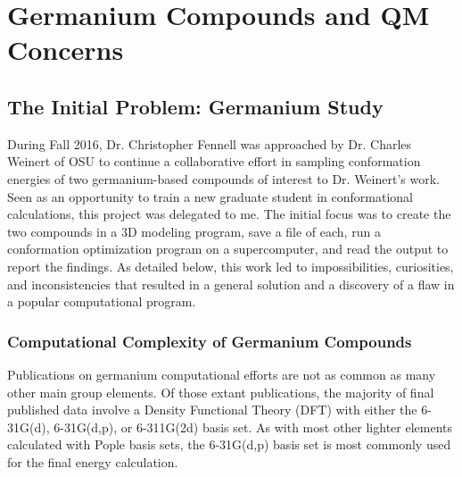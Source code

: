 \chapter{Germanium Compounds and QM Concerns}
\label{ch:Germanium}

%

\section{The Initial Problem: Germanium Study}

During Fall 2016, Dr. Christopher Fennell was approached by Dr. Charles Weinert of OSU to continue a collaborative effort in sampling conformation energies of two germanium-based compounds of interest to Dr. Weinert's work. 
Seen as an opportunity to train a new graduate student in conformational calculations, this project was delegated to me.
The initial focus was to create the two compounds in a 3D modeling program, save a file of each, run a conformation optimization program on a supercomputer, and read the output to report the findings.
As detailed below, this work led to impossibilities, curiosities, and inconsistencies that resulted in a general solution and a discovery of a flaw in a popular computational program.

\subsection{Computational Complexity of Germanium Compounds}

Publications on germanium computational efforts are not as common as many other main group elements. 
Of those extant publications, the majority of final published data involve a Density Functional Theory (DFT) with either the 6-31G(d), 6-31G(d,p), or 6-311G(2d) basis set.\cite{GeCompStudy1}
As with most other lighter elements calculated with Pople basis sets, the 6-31G(d,p) basis set is most commonly used for the final energy calculation.\cite{Weinert1,Weinert2}

